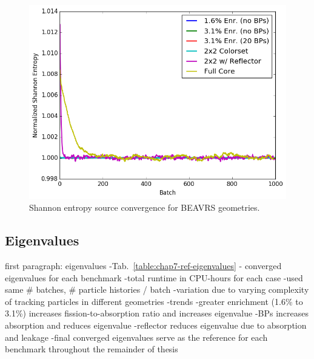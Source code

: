 \begin{figure}[h!]
  \centering
  \includegraphics[width=0.9\linewidth]{figures/benchmarks/entropy/entropy-all}
\caption[Shannon entropy source convergence for BEAVRS geometries]{Shannon entropy source convergence for BEAVRS geometries.}
\label{fig:chap7-entropy}
\end{figure}


\subsection{Eigenvalues}
\label{subsec:chap7-eigenvalues}

first paragraph: eigenvalues
-Tab.~\ref{table:chap7-ref-eigenvalues} - converged eigenvalues for each benchmark
-total runtime in CPU-hours for each case
  -used same \# batches, \# particle histories / batch
  -variation due to varying complexity of tracking particles in different geometries
-trends
  -greater enrichment (1.6\% to 3.1\%) increases fission-to-absorption ratio and increases eigenvalue
  -\ac{BP}s increases absorption and reduces eigenvalue
  -reflector reduces eigenvalue due to absorption and leakage
-final converged eigenvalues serve as the reference for each benchmark throughout the remainder of thesis

